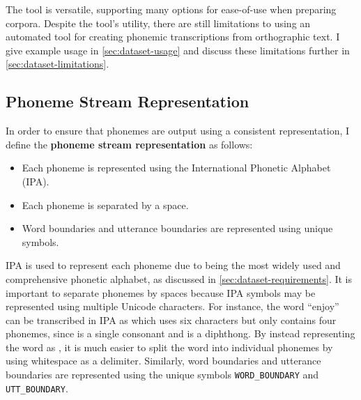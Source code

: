 The tool is versatile, supporting many options for ease-of-use when preparing corpora. Despite the tool's utility, there are still limitations to using an automated tool for creating phonemic transcriptions from orthographic text. I give example usage in \cref{sec:dataset-usage} and discuss these limitations further in \cref{sec:dataset-limitations}.



\subsection{Phoneme Stream Representation}
\label{sec:dataset-phoneme-stream-representation}

In order to ensure that phonemes are output using a consistent representation, I define the \textbf{phoneme stream representation} as follows:
\begin{itemize}
    \item Each phoneme is represented using the International Phonetic Alphabet (IPA).
    \item Each phoneme is separated by a space.
    \item Word boundaries and utterance boundaries are represented using unique symbols.
\end{itemize}

IPA is used to represent each phoneme due to being the most widely used and comprehensive phonetic alphabet, as discussed in \cref{sec:dataset-requirements}. It is important to separate phonemes by spaces because IPA symbols may be represented using multiple Unicode characters. For instance, the word ``enjoy'' can be transcribed in IPA as  which uses six characters but only contains four phonemes, since  is a single consonant and  is a diphthong. By instead representing the word as , it is much easier to split the word into individual phonemes by using whitespace as a delimiter. Similarly, word boundaries and utterance boundaries are represented using the unique symbols \texttt{WORD\_BOUNDARY} and \texttt{UTT\_BOUNDARY}. 

